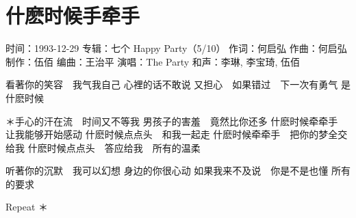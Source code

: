 \documentclass[UTF8,a4paper,oneside,twocolumn,12pt]{ctexbook}
\newcommand{\infopair}[2]{\textbullet #1：#2}
\newcommand{\zc}[1][伍佰]{\infopair{作词}{#1}}
\newcommand{\zq}[1][伍佰]{\infopair{作曲}{#1}}
\newcommand{\bq}[1][伍佰]{\infopair{编曲}{#1}}
\newcommand{\zj}[1]{\infopair{专辑}{#1}}
\newcommand{\zz}[1]{\infopair{制作}{#1}}
\newcommand{\sj}[1]{\infopair{时间}{#1}}
\newenvironment{info}{\begin{flushleft}\kaishu
	}
	{\end{flushleft}\normalsize\yahei\par}
\newenvironment{lyric}{
	}
{}
\begin{document}
\section{什麽时候手牵手}
\begin{info}
	\sj{1993-12-29}
	\zj{七个 Happy Party（5/10）}
	\zc[何启弘]
	\zq[何启弘]
	\zz{伍佰}
	\bq[王治平]
	\infopair{演唱}{The Party}
	\infopair{和声}{李琳, 李宝琦, 伍佰}
\end{info}
\begin{lyric}
	看著你的笑容　我气我自己
	心裡的话不敢说
	又担心　如果错过　下一次有勇气
	是什麽时候

	＊手心的汗在流　时间又不等我
	男孩子的害羞　竟然比你还多
	什麽时候牵牵手　让我能够开始感动
	什麽时候点点头　和我一起走
	什麽时候牵牵手　把你的梦全交给我
	什麽时候点点头　答应给我　所有的温柔

	听著你的沉默　我可以幻想
	身边的你很心动
	如果我来不及说　你是不是也懂
	所有的要求

	Repeat ＊
\end{lyric}
\end{document}
